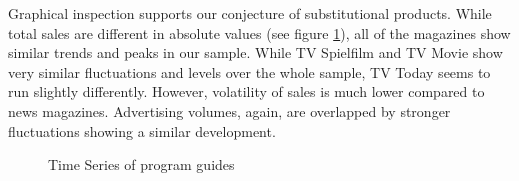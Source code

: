 \documentclass[12pt,a4paper,notitlepage]{article}
\begin{document}
Graphical inspection supports our conjecture of substitutional products. While total sales are different in absolute values (see figure \ref{fig_tv}), all of the magazines show similar trends and peaks in our sample.  While TV Spielfilm and TV Movie show very similar fluctuations and levels over the whole sample, TV Today seems to run slightly differently. However, volatility of sales is much lower compared to news magazines. Advertising volumes, again, are overlapped by stronger fluctuations showing a similar development.  


\begin{figure}[H]\centering
\caption{Time Series of program guides}
	\label{fig_tv}
\end{figure}
\end{document}
